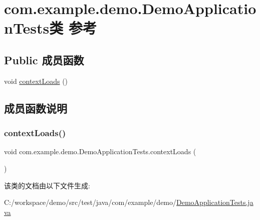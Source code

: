 \hypertarget{classcom_1_1example_1_1demo_1_1_demo_application_tests}{}\section{com.\+example.\+demo.\+Demo\+Application\+Tests类 参考}
\label{classcom_1_1example_1_1demo_1_1_demo_application_tests}
\subsection*{Public 成员函数}
\begin{DoxyCompactItemize}
\item 
void \mbox{\hyperlink{classcom_1_1example_1_1demo_1_1_demo_application_tests_a53da0a7207b5e56d2f50521592b3f204}{context\+Loads}} ()
\end{DoxyCompactItemize}


\subsection{成员函数说明}
\mbox{\label{classcom_1_1example_1_1demo_1_1_demo_application_tests_a53da0a7207b5e56d2f50521592b3f204}} 
\subsubsection{\texorpdfstring{context\+Loads()}{contextLoads()}}
{\footnotesize\ttfamily void com.\+example.\+demo.\+Demo\+Application\+Tests.\+context\+Loads (\begin{DoxyParamCaption}{ }\end{DoxyParamCaption})}



该类的文档由以下文件生成\+:\begin{DoxyCompactItemize}
\item 
C\+:/workspace/demo/src/test/java/com/example/demo/\mbox{\hyperlink{_demo_application_tests_8java}{Demo\+Application\+Tests.\+java}}\end{DoxyCompactItemize}
